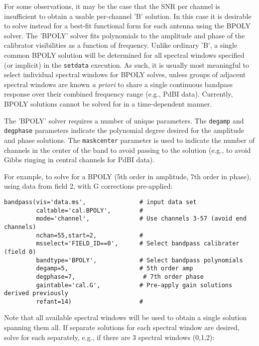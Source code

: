 For some observations, it may be the case that the SNR per channel is
insufficient to obtain a usable per-channel 'B' solution.  In this
case it is desirable to solve instead for a best-fit functional form
for each antenna using the BPOLY solver. The 'BPOLY' solver fits
polynomials to the amplitude and phase of the calibrator
visibilities as a function of frequency.  Unlike ordinary 'B', a
single common BPOLY solution will be determined for all spectral
windows specified (or implicit) in the {\tt setdata} execution.  As
such, it is usually most meaningful to select individual spectral
windows for BPOLY solves, unless groups of adjacent spectral windows
are known {\it a priori} to share a single continuous bandpass
response over their combined frequency range (e.g., PdBI data).
Currently, BPOLY solutions cannot be solved for in a time-dependent
manner.

The 'BPOLY' solver requires a number of unique parameters.  The 
{\tt degamp} and {\tt degphase} parameters indicate the polynomial degree
desired for the amplitude and phase solutions.  The {\tt maskcenter}
parameter is used to indicate the number of channels in the center
of the band to avoid passing to the solution (e.g., to avoid Gibbs
ringing in central channels for PdBI data).

For example, to solve for a BPOLY (5th order in amplitude, 7th order
in phase), using data from field 2, with G corrections pre-applied:

\small
\begin{verbatim}
bandpass(vis='data.ms',               # input data set
         caltable='cal.BPOLY',        #
         mode='channel',              # Use channels 3-57 (avoid end channels)
         nchan=55,start=2,            #
         msselect='FIELD_ID==0',      # Select bandpass calibrater (field 0)
         bandtype='BPOLY',            # Select bandpass polynomials
         degamp=5,                    # 5th order amp
         degphase=7,                   # 7th order phase
         gaintable='cal.G',           # Pre-apply gain solutions derived previously
         refant=14)                   #   
\end{verbatim}
\normalsize

Note that all available spectral windows will be used to obtain a
single solution spanning them all.  If separate solutions for each
spectral window are desired, solve for each separately, e.g., if there
are 3 spectral windows (0,1,2):


